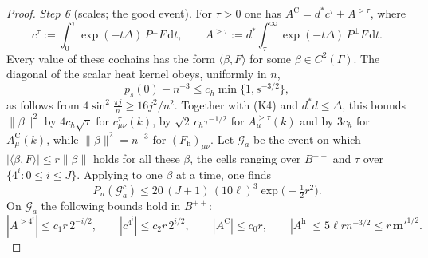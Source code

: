 \documentclass[11pt]{amsart}
\theoremstyle{definition}
\begin{document}
\begin{proof}
\emph{Step 6} (scales; the good event).
For $\tau>0$ one has $A^{\mathrm C}=d^*c^\tau+A^{>\tau}$, where
\begin{equation*}
c^\tau:=\int_0^\tau\exp(-t\Delta)\,P^\perp F\,\mathrm dt,\qquad A^{>\tau}:=d^*\int_\tau^\infty\exp(-t\Delta)\,P^\perp F\,\mathrm dt.
\end{equation*}
Every value of these cochains has the form $\langle\beta,F\rangle$ for some $\beta\in C^2(\Gamma)$.
The diagonal of the scalar heat kernel obeys, uniformly in $n$,
\begin{equation*}
p_s(0)-n^{-3}\le c_h\min\{1,s^{-3/2}\},
\end{equation*}
as follows from $4\sin^2\frac{\pi j}{n}\ge16j^2/n^2$.
Together with (K4) and $d^*d\le\Delta$, this bounds $\|\beta\|^2$ by $4c_h\sqrt\tau$ for $c^\tau_{\mu\nu}(k)$, by $\sqrt2\,c_h\tau^{-1/2}$ for $A^{>\tau}_\mu(k)$ and by $3c_h$ for $A^{\mathrm C}_\mu(k)$, while $\|\beta\|^2=n^{-3}$ for $(F_{\mathrm h})_{\mu\nu}$.
Let $\mathcal G_a$ be the event on which $|\langle\beta,F\rangle|\le r\|\beta\|$ holds for all these $\beta$, the cells ranging over $B^{++}$ and $\tau$ over $\{4^i:0\le i\le J\}$.
Applying \cite[Theorem~6.27\,(c)]{QEDII} to one $\beta$ at a time, one finds
\begin{equation*}
P_n(\mathcal G_a^c)\le20\,(J+1)\,(10\ell)^3\exp\bigl(-\tfrac12r^2\bigr).
\end{equation*}
On $\mathcal G_a$ the following bounds hold in $B^{++}$:
\begin{equation*}
|A^{>4^i}|\le c_1r\,2^{-i/2},\qquad|c^{4^i}|\le c_2r\,2^{i/2},\qquad|A^{\mathrm C}|\le c_0r,\qquad|A^{\mathrm h}|\le5\ell rn^{-3/2}\le r\,\mathbf m'^{1/2}.
\end{equation*}


\end{proof}
\end{document}
